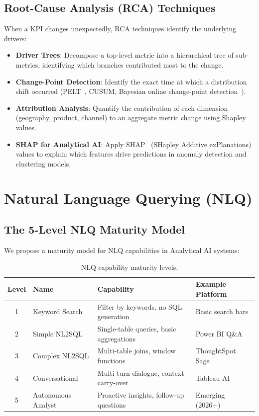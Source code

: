\documentclass[12pt, a4paper]{article}
\begin{document}
\subsection{Root-Cause Analysis (RCA) Techniques}
When a KPI changes unexpectedly, RCA techniques identify the underlying drivers:

\begin{itemize}
    \item \textbf{Driver Trees}: Decompose a top-level metric into a hierarchical tree of sub-metrics, identifying which branches contributed most to the change.
    \item \textbf{Change-Point Detection}: Identify the exact time at which a distribution shift occurred (PELT~\citep{killick2012pelt}, CUSUM, Bayesian online change-point detection~\citep{adams2007bocpd}).
    \item \textbf{Attribution Analysis}: Quantify the contribution of each dimension (geography, product, channel) to an aggregate metric change using Shapley values.
    \item \textbf{SHAP for Analytical AI}: Apply SHAP~\citep{lundberg2017shap} (SHapley Additive exPlanations) values to explain which features drive predictions in anomaly detection and clustering models.
\end{itemize}

\section{Natural Language Querying (NLQ)}\label{sec:nlq}

\subsection{The 5-Level NLQ Maturity Model}
We propose a maturity model for NLQ capabilities in Analytical AI systems:

\begin{table}[ht]
\centering
\caption{NLQ capability maturity levels.}
\label{tab:nlq-levels}
\begin{tabular}{c l >{\raggedright\arraybackslash}p{5.0cm} >{\raggedright\arraybackslash}p{3.2cm}}
\toprule
\textbf{Level} & \textbf{Name} & \textbf{Capability} & \textbf{Example Platform} \\
\midrule
1 & Keyword Search     & Filter by keywords, no SQL generation  & Basic search bars \\
2 & Simple NL2SQL      & Single-table queries, basic aggregations & Power BI Q\&A \\
3 & Complex NL2SQL     & Multi-table joins, window functions      & ThoughtSpot Sage \\
4 & Conversational     & Multi-turn dialogue, context carry-over  & Tableau AI \\
5 & Autonomous Analyst & Proactive insights, follow-up questions  & Emerging (2026+) \\
\bottomrule
\end{tabular}
\end{table}
\end{document}
